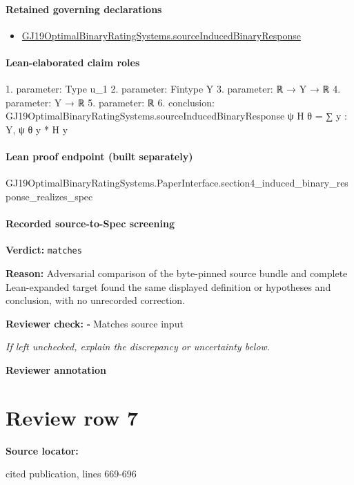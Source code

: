 \documentclass[10pt]{article}
\newcommand{\reviewerbox}{%
  \par\noindent\fbox{\parbox{0.96\linewidth}{\rule{0pt}{0.38in}}}\par
}
\newcommand{\reviewmatch}[1]{%
  \par\noindent\textbf{Reviewer check:} $\square$\; #1\par
  \noindent\emph{If left unchecked, explain the discrepancy or uncertainty below.}\par
}
\begin{document}
\paragraph{Retained governing declarations}
\begin{itemize}\raggedright
\item \hyperlink{governing-declaration-c4e5cce8dd99281a}{GJ19\allowbreak{}Optimal\allowbreak{}Binary\allowbreak{}Rating\allowbreak{}Systems.\allowbreak{}source\allowbreak{}Induced\allowbreak{}Binary\allowbreak{}Response}
\end{itemize}
\paragraph{Lean-elaborated claim roles}\begin{ReviewVerbatim}
1. parameter: Type u_1
2. parameter: Fintype Y
3. parameter: ℝ → Y → ℝ
4. parameter: Y → ℝ
5. parameter: ℝ
6. conclusion: GJ19OptimalBinaryRatingSystems.sourceInducedBinaryResponse ψ H θ = ∑ y : Y, ψ θ y * H y
\end{ReviewVerbatim}

\paragraph{Lean proof endpoint (built separately)}\begin{ReviewVerbatim}
GJ19OptimalBinaryRatingSystems.PaperInterface.section4_induced_binary_response_realizes_spec
\end{ReviewVerbatim}

\paragraph{Recorded source-to-Spec screening}
\textbf{Verdict:} \texttt{matches}
\\
{\raggedright
\textbf{Reason:} Adversarial comparison of the byte-\allowbreak{}pinned source bundle and complete Lean-\allowbreak{}expanded target found the same displayed definition or hypotheses and conclusion, with no unrecorded correction.\allowbreak{}
\par}
\reviewmatch{Matches source input}
\noindent\textbf{Reviewer annotation}\par
\reviewerbox
\clearpage
\hypertarget{source-claim-3fed172202fb05fc}{}
\section*{Review row 7}
\textbf{Source locator:} {\footnotesize\raggedright cited publication, lines 669-\allowbreak{}696\par}
\end{document}
